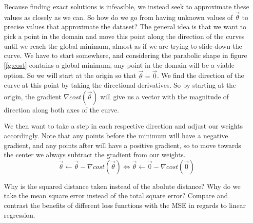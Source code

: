 Because finding exact solutions is infeasible, we instead seek to approximate
these values as closely as we can. So how do we go from having unknown values of
$\vec\theta$ to precise values that approximate the dataset? The general idea is
that we want to pick a point in the domain and move this point along the direction of the curves until we reach the global minimum, almost as if we are trying to slide down the curve. We have to start
somewhere, and considering the parabolic shape in figure \ref{fg:cost} contains a
global minimum, any point in the domain will be a viable option. So we will start at the origin so that $\vec\theta = \vec0$. We find the direction of the curve at this point by taking the directional derivatives. So by starting at the origin, the gradient $\nabla cost(\vec\theta)$ will give us a vector with the magnitude of direction along both axes of the curve.

We then want to take a step in each respective direction and adjust our weights accordingly. Note that any points before the minimum will have a negative gradient, and any points after will have a positive gradient, so to move towards the center we always subtract the gradient from our weights.
\begin{equation}
\vec\theta \leftarrow \vec\theta - \nabla cost(\vec\theta) \Longleftrightarrow \vec\theta \leftarrow \vec0 - \nabla cost(\vec0)
\end{equation}



\begin{exercise}
    \ex Why is the squared distance taken instead of the abolute distance?
    \ex Why do we take the mean square error instead of the total square error?
    \ex Compare and contrast the benefits of different loss functions with the
    MSE in regards to linear regression.
\end{exercise}

